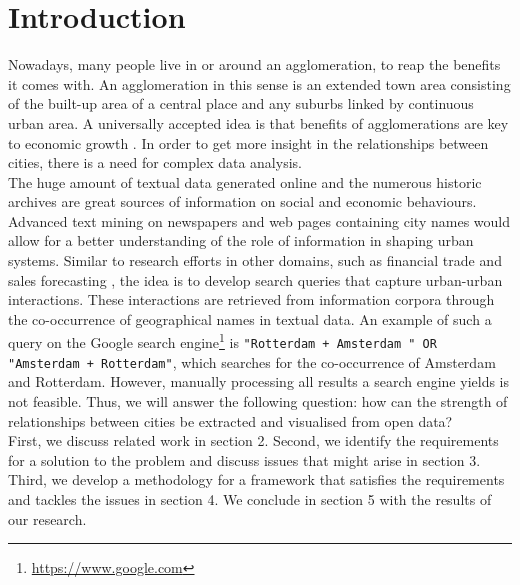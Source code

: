 \newpage
\section{Introduction}

Nowadays, many people live in or around an agglomeration, to reap the benefits it comes with. An agglomeration in this sense is an extended town area consisting of the built-up area of a central place and any suburbs linked by continuous urban area. A universally accepted idea is that benefits of agglomerations are key to economic growth \cite{porter2000location}. In order to get more insight in the relationships between cities, there is a need for complex data analysis. \\

The huge amount of textual data generated online and the numerous historic archives are great sources of information on social and economic behaviours. Advanced text mining on newspapers and web pages containing city names would allow for a better understanding of the role of information in shaping urban systems. Similar to research efforts in other domains, such as financial trade \cite{preis2013quantifying} and sales forecasting \cite{wu2014future}, the idea is to develop search queries that capture urban-urban interactions. These interactions are retrieved from information corpora through the co-occurrence of geographical names in textual data. An example of such a query on the Google search engine\footnote{\url{https://www.google.com}} is \texttt{"Rotterdam + Amsterdam " OR "Amsterdam + Rotterdam"}, which searches for the co-occurrence of Amsterdam and Rotterdam. However, manually processing all results a search engine yields is not feasible. Thus, we will answer the following question: 
how can the strength of relationships between cities be extracted and visualised from open data? \\

First, we discuss related work in section 2. Second, we identify the requirements for a solution to the problem and discuss issues that might arise in section 3. Third, we develop a methodology for a framework that satisfies the requirements and tackles the issues in section 4. We conclude in section 5 with the results of our research.
